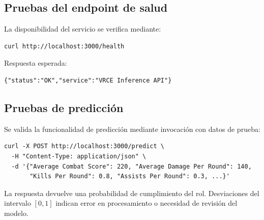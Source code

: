 \documentclass{ULBreport} %
\begin{document}
\subsection{Pruebas del endpoint de salud}

La disponibilidad del servicio se verifica mediante:

\begin{verbatim}
curl http://localhost:3000/health
\end{verbatim}

Respuesta esperada:

\begin{verbatim}
{"status":"OK","service":"VRCE Inference API"}
\end{verbatim}

\subsection{Pruebas de predicción}

Se valida la funcionalidad de predicción mediante invocación con datos de prueba:

\begin{verbatim}
curl -X POST http://localhost:3000/predict \
  -H "Content-Type: application/json" \
  -d '{"Average Combat Score": 220, "Average Damage Per Round": 140, 
       "Kills Per Round": 0.8, "Assists Per Round": 0.3, ...}'
\end{verbatim}

La respuesta devuelve una probabilidad de cumplimiento del rol. Desviaciones del intervalo $[0, 1]$ indican error en procesamiento o necesidad de revisión del modelo.
\end{document}
